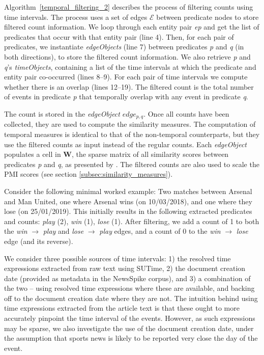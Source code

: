 \documentclass[11pt]{article}
\begin{document}
Algorithm~\ref{temporal_filtering_2} describes the process of filtering counts using time intervals. The process uses a set of edges $\mathcal{E}$ between predicate nodes to store filtered count information. We loop through each entity pair \textit{ep} and get the list of predicates that occur with that entity pair (line 4). Then, for each pair of predicates, we instantiate \textit{edgeObjects} (line 7) between predicates \textit{p} and \textit{q} (in both directions), to store the filtered count information. We also retrieve \textit{p} and \textit{q}'s \textit{timeObjects}, containing a list of the time intervals at which the predicate and entity pair co-occurred (lines 8--9). For each pair of time intervals we compute whether there is an overlap (lines 12--19). The filtered count is the total number of events in predicate \textit{p} that temporally overlap with any event in predicate \textit{q}. 

The count is stored in the \textit{edgeObject} $edge_{p,q}$. Once all counts have been collected, they are used to compute the similarity measures. The computation of temporal measures is identical to that of the non-temporal counterparts, but they use the filtered counts as input instead of the regular counts. Each \textit{edgeObject} populates a cell in $\mathbf{W}$, the sparse matrix of all similarity scores between predicates \textit{p} and \textit{q}, as presented by . The filtered counts are also used to scale the PMI scores (see section \ref{subsec:similarity_measures}).

Consider the following minimal worked example: Two matches between Arsenal and Man United, one where Arsenal wins (on 10/03/2018), and one where they lose (on 25/01/2019). This initially results in the following extracted predicates and counts: \textit{play} (2), \textit{win} (1), \textit{lose} (1). After filtering, we add a count of 1 to both the \textit{win} $\rightarrow$ \textit{play} and \textit{lose} $\rightarrow$ \textit{play} edges, and a count of 0 to the \textit{win} $\rightarrow$ \textit{lose} edge (and its reverse).

We consider three possible sources of time intervals: 1) the resolved time expressions extracted from raw text using SUTime, 2) the document creation date (provided as metadata in the NewsSpike corpus), and 3) a combination of the two -- using resolved time expressions where these are available, and backing off to the document creation date where they are not. The intuition behind using time expressions extracted from the article text is that these ought to more accurately pinpoint the time interval of the events. However, as such expressions may be sparse, we also investigate the use of the document creation date, under the assumption that sports news is likely to be reported very close the day of the event.
\end{document}
